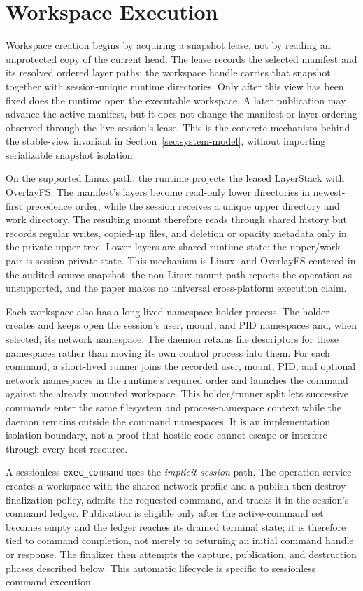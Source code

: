 \section{Workspace Execution}
\label{sec:workspace-execution}

Workspace creation begins by acquiring a snapshot lease, not by reading an
unprotected copy of the current head.  The lease records the selected manifest
and its resolved ordered layer paths; the workspace handle carries that
snapshot together with session-unique runtime directories.  Only after this
view has been fixed does the runtime open the executable workspace.  A later
publication may advance the active manifest, but it does not change the
manifest or layer ordering observed through the live session's lease.  This is
the concrete mechanism behind the stable-view invariant in
Section~\ref{sec:system-model}, without importing serializable snapshot
isolation.

On the supported Linux path, the runtime projects the leased LayerStack with
OverlayFS.  The manifest's layers become read-only lower directories in
newest-first precedence order, while the session receives a unique upper
directory and work directory.  The resulting mount therefore reads through
shared history but records regular writes, copied-up files, and deletion or
opacity metadata only in the private upper tree.  Lower layers are shared
runtime state; the upper/work pair is session-private state.  This mechanism
is Linux- and OverlayFS-centered in the audited source snapshot: the non-Linux mount
path reports the operation as unsupported, and the paper makes no universal
cross-platform execution claim.

Each workspace also has a long-lived namespace-holder process.  The holder
creates and keeps open the session's user, mount, and PID namespaces and, when
selected, its network namespace.  The daemon retains file descriptors for
these namespaces rather than moving its own control process into them.  For
each command, a short-lived runner joins the recorded user, mount, PID, and
optional network namespaces in the runtime's required order and launches the
command against the already mounted workspace.  This holder/runner split lets
successive commands enter the same filesystem and process-namespace context
while the daemon remains outside the command namespaces.  It is an
implementation isolation boundary, not a proof that hostile code cannot
escape or interfere through every host resource.

A sessionless \texttt{exec\_command} uses the \emph{implicit session} path.
The operation service creates a workspace with the shared-network profile and
a publish-then-destroy finalization policy, admits the requested command, and
tracks it in the session's command ledger.  Publication is eligible only after
the active-command set becomes empty and the ledger reaches its drained
terminal state; it is therefore tied to command completion, not merely to
returning an initial command handle or response.  The finalizer then attempts
the capture, publication, and destruction phases described below.  This
automatic lifecycle is specific to sessionless command execution.

